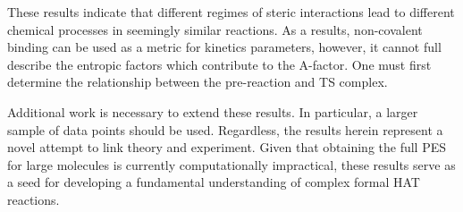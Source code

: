 These results indicate that different regimes of steric interactions lead to different chemical processes in seemingly similar reactions. As a results, non-covalent binding can be used as a metric for kinetics parameters, however, it cannot full describe the entropic factors which contribute to the A-factor. One must first determine the relationship between the pre-reaction and TS complex.

Additional work is necessary to extend these results. In particular, a larger sample of data points should be used. Regardless, the results herein represent a novel attempt to link theory and experiment. Given that obtaining the full PES for large molecules is currently computationally impractical, these results serve as a seed for developing a fundamental understanding of complex formal HAT reactions.
